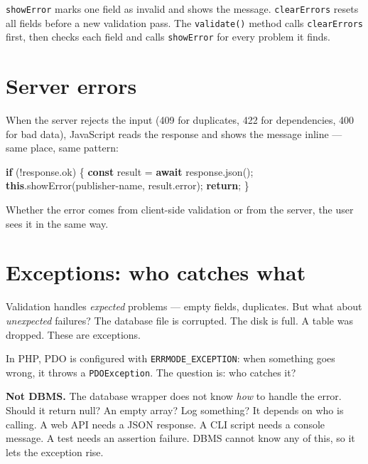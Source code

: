 \documentclass[11pt,a4paper,oneside]{book}
\newenvironment{Shaded}{\begin{snugshade}}{\end{snugshade}}
\newcommand{\KeywordTok}[1]{\textcolor[HTML]{007020}{\textbf{#1}}}
\newcommand{\StringTok}[1]{\textcolor[HTML]{4070A0}{#1}}
\newcommand{\FunctionTok}[1]{\textcolor[HTML]{06287E}{#1}}
\newcommand{\ControlFlowTok}[1]{\textcolor[HTML]{007020}{\textbf{#1}}}
\newcommand{\OperatorTok}[1]{\textcolor[HTML]{666666}{#1}}
\newcommand{\AttributeTok}[1]{\textcolor[HTML]{7D9029}{#1}}
\newcommand{\NormalTok}[1]{#1}
\begin{document}
\texttt{showError} marks one field as invalid and shows the
message. \texttt{clearErrors} resets all fields before a new
validation pass. The \texttt{validate()} method calls
\texttt{clearErrors} first, then checks each field and calls
\texttt{showError} for every problem it finds.

\hypertarget{server-errors}{%
\section{Server errors}\label{server-errors}}

When the server rejects the input (409 for duplicates, 422 for
dependencies, 400 for bad data), JavaScript reads the response
and shows the message inline --- same place, same pattern:

\begin{Shaded}
\begin{Highlighting}[]
\ControlFlowTok{if}\NormalTok{ (}\OperatorTok{!}\NormalTok{response}\OperatorTok{.}\AttributeTok{ok}\NormalTok{) \{}
    \KeywordTok{const}\NormalTok{ result }\OperatorTok{=} \ControlFlowTok{await}\NormalTok{ response}\OperatorTok{.}\FunctionTok{json}\NormalTok{()}\OperatorTok{;}
    \KeywordTok{this}\OperatorTok{.}\FunctionTok{showError}\NormalTok{(}\StringTok{\textquotesingle{}publisher{-}name\textquotesingle{}}\OperatorTok{,}\NormalTok{ result}\OperatorTok{.}\AttributeTok{error}\NormalTok{)}\OperatorTok{;}
    \ControlFlowTok{return}\OperatorTok{;}
\NormalTok{\}}
\end{Highlighting}
\end{Shaded}

Whether the error comes from client-side validation or from the
server, the user sees it in the same way.

\hypertarget{exceptions-who-catches-what}{%
\section{Exceptions: who catches
what}\label{exceptions-who-catches-what}}

Validation handles \emph{expected} problems --- empty fields,
duplicates. But what about \emph{unexpected} failures? The
database file is corrupted. The disk is full. A table was
dropped. These are exceptions.

In PHP, PDO is configured with \texttt{ERRMODE\_EXCEPTION}: when
something goes wrong, it throws a \texttt{PDOException}. The
question is: who catches it?

\textbf{Not DBMS.} The database wrapper does not know \emph{how}
to handle the error. Should it return null? An empty array? Log
something? It depends on who is calling. A web API needs a JSON
response. A CLI script needs a console message. A test needs an
assertion failure. DBMS cannot know any of this, so it lets the
exception rise.
\end{document}
